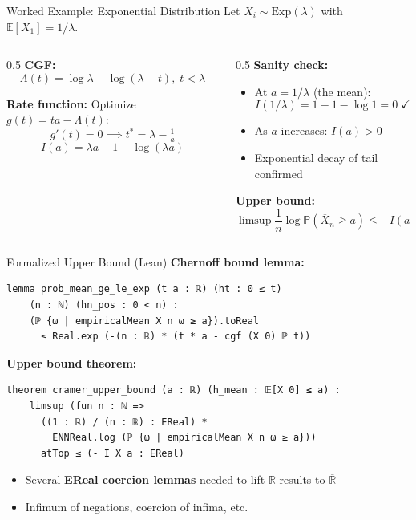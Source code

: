\documentclass[aspectratio=169]{beamer}
\newcommand{\E}{\mathbb{E}}
\renewcommand{\P}{\mathbb{P}}
\newcommand{\R}{\mathbb{R}}
\begin{document}
\begin{frame}{Worked Example: Exponential Distribution}
  Let $X_i \sim \text{Exp}(\lambda)$ with $\E[X_1] = 1/\lambda$.

  \begin{columns}[T]
    \begin{column}{0.5\textwidth}
      \textbf{CGF:}
      \[
        \Lambda(t) = \log\lambda - \log(\lambda - t), \; t < \lambda
      \]

      \textbf{Rate function:}
      Optimize $g(t) = ta - \Lambda(t)$:
      \[
        g'(t) = 0 \implies t^* = \lambda - \tfrac{1}{a}
      \]
      \[
        I(a) = \lambda a - 1 - \log(\lambda a)
      \]
    \end{column}
    \begin{column}{0.5\textwidth}
      \textbf{Sanity check:}
      \begin{itemize}
        \item At $a = 1/\lambda$ (the mean):
          \[
            I(1/\lambda) = 1 - 1 - \log 1 = 0 \;\checkmark
          \]
        \item As $a$ increases: $I(a) > 0$
        \item Exponential decay of tail confirmed
      \end{itemize}
      \vspace{0.3cm}
      \textbf{Upper bound:}
      \[
        \limsup \frac{1}{n}\log\P(\overline{X}_n \ge a) \le -I(a)
      \]
    \end{column}
  \end{columns}
\end{frame}

\begin{frame}[fragile]{Formalized Upper Bound (Lean)}
  \textbf{Chernoff bound lemma:}
\begin{lstlisting}[basicstyle=\ttfamily\scriptsize]
lemma prob_mean_ge_le_exp (t a : ℝ) (ht : 0 ≤ t)
    (n : ℕ) (hn_pos : 0 < n) :
    (ℙ {ω | empiricalMean X n ω ≥ a}).toReal
      ≤ Real.exp (-(n : ℝ) * (t * a - cgf (X 0) ℙ t))
\end{lstlisting}
  \vspace{0.2cm}
  \textbf{Upper bound theorem:}
\begin{lstlisting}[basicstyle=\ttfamily\scriptsize]
theorem cramer_upper_bound (a : ℝ) (h_mean : 𝔼[X 0] ≤ a) :
    limsup (fun n : ℕ =>
      ((1 : ℝ) / (n : ℝ) : EReal) *
        ENNReal.log (ℙ {ω | empiricalMean X n ω ≥ a}))
      atTop ≤ (- I X a : EReal)
\end{lstlisting}
  \vspace{0.2cm}
  \begin{itemize}
    \item Several \textbf{EReal coercion lemmas} needed to lift $\R$ results to $\overline{\R}$
    \item Infimum of negations, coercion of infima, etc.
  \end{itemize}
\end{frame}
\end{document}
